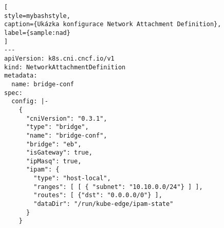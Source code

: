 \begin{lstfloat}
\begin{lstlisting}[
style=mybashstyle,
caption={Ukázka konfigurace Network Attachment Definition},
label={sample:nad}
]
---
apiVersion: k8s.cni.cncf.io/v1
kind: NetworkAttachmentDefinition
metadata:
  name: bridge-conf
spec:
  config: |-
    {
      "cniVersion": "0.3.1",
      "type": "bridge",
      "name": "bridge-conf",
      "bridge": "eb",
      "isGateway": true,
      "ipMasq": true,
      "ipam": {
        "type": "host-local",
        "ranges": [ [ { "subnet": "10.10.0.0/24"} ] ],
        "routes": [ {"dst": "0.0.0.0/0"} ],
        "dataDir": "/run/kube-edge/ipam-state"
      }
    }
\end{lstlisting}
\end{lstfloat}

